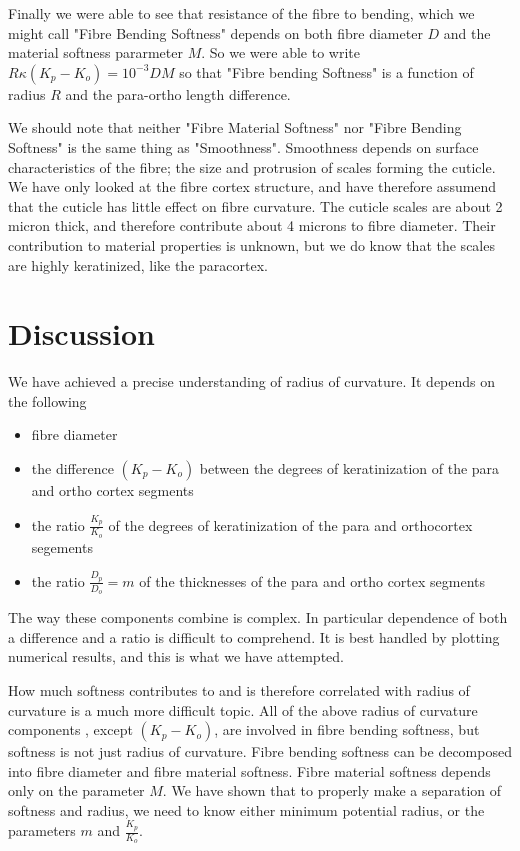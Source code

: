 \documentclass[titlepage]{article}  %
\begin{document}
Finally we were able to see that resistance of the fibre to bending, which we might call "Fibre Bending Softness" depends on both fibre diameter $D$ and the material softness pararmeter $M$. So we were able to write $R \kappa(K_{p} - K_{o}) = 10^{-3}D M$ so that "Fibre bending Softness" is a function of radius $R$ and the para-ortho length difference.

We should note that neither "Fibre Material Softness" nor "Fibre Bending Softness" is the same thing as "Smoothness". Smoothness depends on surface characteristics of the fibre; the size and protrusion of scales forming the cuticle. We have only looked at the fibre cortex structure, and have therefore assumend that the cuticle has little effect on fibre curvature. The cuticle scales are about 2 micron thick, and therefore contribute about 4 microns to fibre diameter. Their contribution to material properties is unknown, but we do know that the scales are highly keratinized, like the paracortex.

\section{Discussion}
We have achieved a precise understanding of radius of curvature. It depends on 
the following
\begin{itemize}
\item fibre diameter
\item the difference $(K_{p} - K_{o})$ between the degrees of keratinization of the para and ortho cortex segments
\item the ratio $\frac{K_{p}}{K_{o}}$ of the degrees of keratinization of the para and orthocortex segements
\item the ratio $\frac{D_{p}}{D_{o}} = m$ of the thicknesses of the para and ortho cortex segments
\end{itemize}
The way these components combine is complex. In particular dependence of both a difference and a ratio is difficult to comprehend. It is best handled by plotting numerical results, and this is what we have attempted.

How much softness contributes to and is therefore correlated with radius of curvature is a much more difficult topic. All of the above radius of curvature components , except $(K_{p} - K_{o})$, are involved in fibre bending softness, but softness is not just radius of curvature. Fibre bending softness can be decomposed into fibre diameter and fibre material softness. Fibre material softness depends only on the parameter $M$. We have shown that to properly make a separation of softness and radius, we need to know either minimum potential radius, or the parameters $m$ and $\frac{K_{p}}{K_{o}}$.  
\end{document}
